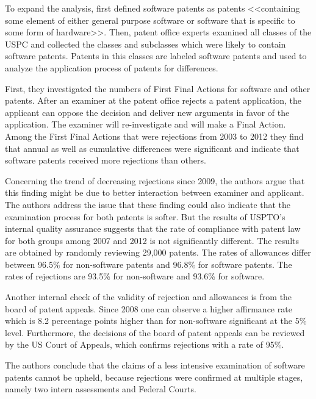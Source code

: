 \documentclass[12pt, a4paper, abstract, parskip]{scrartcl}
\theoremstyle{definition}
\begin{document}
To expand the analysis, \citeauthor{graham2013smart} first defined software
patents as patents <<containing some element of either general purpose software
or software that is specific to some form of
hardware>>\citep[p.~75]{graham2013smart}. Then, patent office experts examined
all classes of the USPC and collected the classes and subclasses which were
likely to contain software patents. Patents in this classes are labeled
software patents and used to analyze the application process of patents for
differences.

First, they investigated the numbers of First Final Actions for software and
other patents. After an examiner at the patent office rejects a patent
application, the applicant can oppose the decision and deliver new arguments in
favor of the application. The examiner will re-investigate and will make a Final
Action. Among the First Final Actions that were rejections from 2003 to 2012
they find that annual as well as cumulative differences were significant and
indicate that software patents received more rejections than others.

Concerning the trend of decreasing rejections since 2009, the authors argue
that this finding might be due to better interaction between examiner and
applicant. The authors address the issue that these finding could also indicate
that the examination process for both patents is softer. But the results of
USPTO's internal quality assurance suggests that the rate of compliance with
patent law for both groups among 2007 and 2012 is not significantly different.
The results are obtained by randomly reviewing 29,000 patents. The rates of
allowances differ between 96.5\% for non-software patents and 96.8\% for
software patents. The rates of rejections are 93.5\% for non-software and
93.6\% for software.

Another internal check of the validity of rejection and allowances is from the
board of patent appeals. Since 2008 one can observe a higher affirmance rate
which is 8.2 percentage points higher than for non-software significant at the
5\% level. Furthermore, the decisions of the board of patent appeals can be
reviewed by the US Court of Appeals, which confirms rejections with a rate of
95\%.

The authors conclude that the claims of a less intensive examination of
software patents cannot be upheld, because rejections were confirmed at
multiple stages, namely two intern assessments and Federal Courts.

\end{document}
